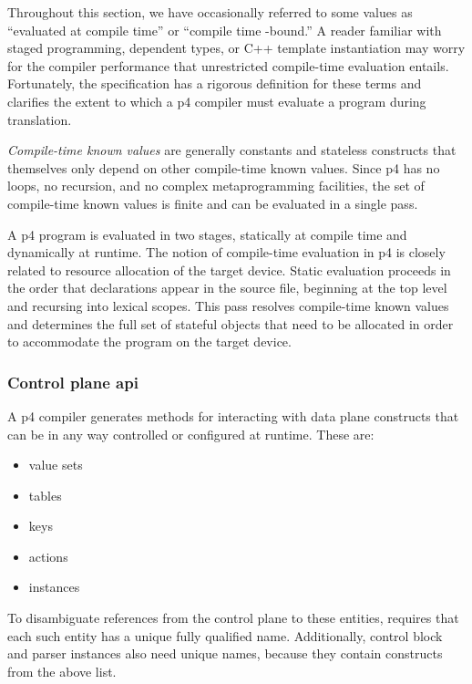 Throughout this section, we have occasionally referred to some values as
``evaluated at compile time'' or ``compile time -bound.'' A reader familiar with staged programming,
dependent types, or C++ template instantiation may worry for the compiler
performance that unrestricted compile-time evaluation entails. Fortunately, the
\pfs specification has a rigorous definition for these terms and clarifies the
extent to which a \acrshort{p4} compiler must evaluate a program during
translation.

\emph{Compile-time known values} are generally constants and stateless
constructs that themselves only depend on other compile-time known values. Since
\acrshort{p4} has no loops, no recursion, and no complex metaprogramming
facilities, the set of compile-time known values is finite and can be evaluated
in a single pass.

A \acrshort{p4} program is evaluated in two stages, statically at compile time
and dynamically at runtime. The notion of compile-time evaluation in
\acrshort{p4} is closely related to resource allocation of the target device.
Static evaluation proceeds in the order that declarations appear in the source
file, beginning at the top level and recursing into lexical scopes. This pass
resolves compile-time known values and determines the full set of stateful
objects that need to be allocated in order to accommodate the program on the
target device.

\subsubsection*{Control plane \acrshort{api}}

A \acrshort{p4} compiler generates methods for interacting with data plane
constructs that can be in any way controlled or configured at runtime. These are:

\begin{itemize}
	\item value sets
	\item tables
	\item keys
	\item actions
	\item \extern{} instances
\end{itemize}

To disambiguate references from the control plane to these entities, \pfs
requires that each such entity has a unique fully qualified name. Additionally,
control block and parser instances also need unique names, because they contain
constructs from the above list.

